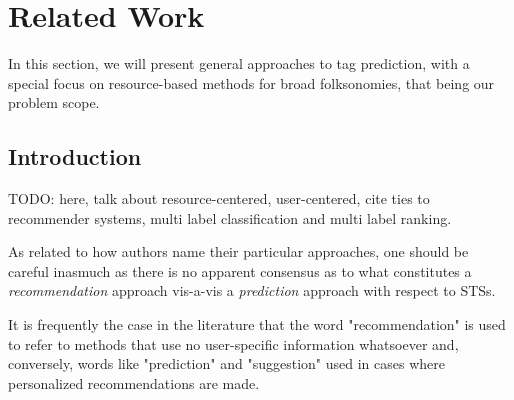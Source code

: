 \chapter{Related Work}\label{chap:related_work}

In this section, we will present general approaches to tag prediction, with a special focus on resource-based  methods for broad folksonomies, that being our problem scope.

\section{Introduction}

{\color{red} TODO: here, talk about resource-centered, user-centered, cite ties to recommender systems, multi label classification and multi label ranking.}

As related to how authors name their particular approaches, one should be careful inasmuch as there is no apparent consensus as to what constitutes a \textit{recommendation} approach vis-a-vis a \textit{prediction} approach with respect to STSs. 

It is frequently the case in the literature that the word "recommendation" is used to refer to methods that use no user-specific information whatsoever and, conversely, words like "prediction" and "suggestion" used in cases where personalized recommendations are made.






